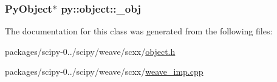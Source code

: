 \subsubsection[{\+\_\+obj}]{\setlength{\rightskip}{0pt plus 5cm}Py\+Object$\ast$ py\+::object\+::\+\_\+obj\hspace{0.3cm}{\ttfamily [protected]}}\label{classpy_1_1object_a722ee8e32f66424a817f790e70acc2aa}


The documentation for this class was generated from the following files\+:\begin{DoxyCompactItemize}
\item 
packages/scipy-\/0../scipy/weave/scxx/\hyperlink{object_8h}{object.\+h}\item 
packages/scipy-\/0../scipy/weave/scxx/\hyperlink{weave__imp_8cpp}{weave\+\_\+imp.\+cpp}\end{DoxyCompactItemize}
